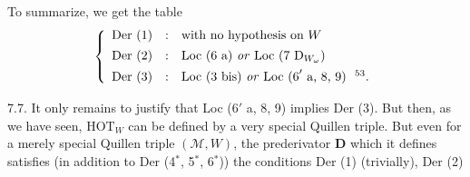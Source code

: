 \documentclass[11pt]{article}
\begin{document}
To summarize, we get the table
\[
\left\{
\begin{array}{lcl}
\text{Der (1)} & : & \text{with no hypothesis on } W \\[1ex]
\text{Der (2)} & : & \text{Loc (6 a) \textit{or} Loc (7 }\mathrm{D}_{W_\omega}\text{)} \\[1ex]
\text{Der (3)} & : & \text{Loc (3 bis) \textit{or} Loc (6}'\text{ a, 8, 9)\ \ \footnotemark[53].}
\end{array}
\right.
\]

7.7. It only remains to justify that Loc (6$'$ a, 8, 9) implies Der (3). But then, as we have seen, $\mathrm{HOT}_W$ can be defined by a very special Quillen triple. But even for a merely special Quillen triple $(\mathcal{M},W)$, the prederivator $\mathbf{D}$ which it defines satisfies (in addition to Der (4$^*$, 5$^*$, 6$^*$)) the conditions Der (1) (trivially), Der (2)
\end{document}
